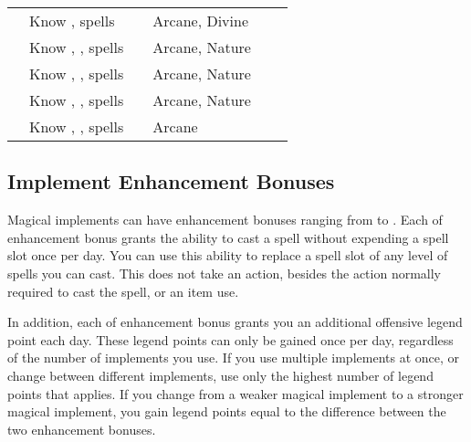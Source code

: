 \begin{longtabuwrapper}
\begin{longtabu}{l X l l l l}
                 & Know ,  spells &  & Arcane, Divine &  \\
                 & Know , ,  spells &  & Arcane, Nature &  \\
                 & Know , ,  spells &  & Arcane, Nature &  \\
                 & Know , ,  spells &  & Arcane, Nature &  \\
                 & Know , ,  spells &  & Arcane &  \\
            \end{longtabu}
        \end{longtabuwrapper}
        \twocolumn

    \subsection{Implement Enhancement Bonuses}\label{Implement Enhancement Bonuses}

        Magical implements can have enhancement bonuses ranging from  to .
        Each  of enhancement bonus grants the ability to cast a spell without expending a spell slot once per day.
        You can use this ability to replace a spell slot of any level of spells you can cast.
        This does not take an action, besides the action normally required to cast the spell, or an item use.

        In addition, each  of enhancement bonus grants you an additional offensive legend point each day.
        These legend points can only be gained once per day, regardless of the number of implements you use.
        If you use multiple implements at once, or change between different implements, use only the highest number of legend points that applies.
        If you change from a weaker magical implement to a stronger magical implement, you gain legend points equal to the difference between the two enhancement bonuses.

